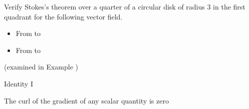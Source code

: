\begin{ELexample}{}

Verify Stokes's theorem over a quarter of a circular disk of radius 3 in the first quadrant for the following vector field.


\begin{ELsolution}


\begin{itemize}
\tightlist
\item
  From  to 
\end{itemize}


\begin{itemize}
\tightlist
\item
  From  to 
\end{itemize}



(examined in Example )

\end{ELsolution}

\end{ELexample}

\ELhold


\begin{ELimportant}{Identity I}

The curl of the gradient of any scalar quantity is zero

\end{ELimportant}

